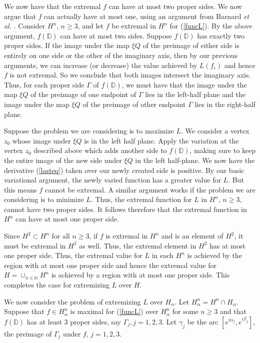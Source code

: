 \documentclass[final]{siamltex}
\newcommand{\dsp}{\displaystyle}
\newcommand{\N}{\mathbb{N}}
\newcommand{\D}{\mathbb{D}}
\newcommand{\eps}{\epsilon}
\begin{document}
We now have that the extremal $f$ can have at most two proper sides.  We now argue that $f$ can actually have at most one, using an argument from Barnard \emph{et al.} \cite{bw03}.  Consider $H^n,\, n \ge 3$, and let $f$ be extremal in $H^n$ for (\ref{funcL}).  By the above argument, $f(\D)$ can have at most two sides.  Suppose $f(\D)$ has exactly two proper sides. If the image under the map $\xi Q$ of the preimage of either side is entirely on one side or the other of the imaginary axis, then by our previous arguments, we can increase (or decrease) the value achieved by $L(f_{\eps})$ and hence $f$ is not extremal.  So we conclude that both images intersect the imaginary axis.  Thus, for each proper side $\Gamma$ of $f(\D)$, we must have that the image under the map $\xi Q$ of the preimage of one endpoint of $\Gamma$ lies in the left-half plane and the image under the map $\xi Q$ of the preimage of other endpoint $\Gamma$ lies in the right-half plane. 

Suppose the problem we are considering is to maximize $L$.  We consider a vertex $z_0$ whose image under $\xi Q$ is in the left half plane. Apply the variation at the vertex $z_0$ described above which adds another side to $f(\D)$, 
making sure to keep the entire image of the new side under $\xi Q$ in the left 
half-plane.  We now have the derivative (\ref{lasteq}) taken over our 
newly created side is positive.  By our basic variational argument, the newly varied 
function has a greater value for $L$.  But this means $f$ cannot 
be extremal.  A similar argument works if the problem we are considering is to minimize $L$. Thus, the extremal function for $L$ in $H^n,\, n\geq 3,$ cannot have two proper sides.  It follows therefore that the extremal function in $H^n$ can have at most one proper side.  

Since $H^2 \subset H^n$ for all $n \geq 3$, if $f$ is extremal in $H^n$ and is an element of $H^2$, it must be extremal in $H^2$ as well.  Thus, the extremal element in $H^2$ has at most one proper side.  Thus, the extremal value for $L$ in each $H^n$ is achieved by the region with at most one proper side and hence the extremal value for $\dsp{H = \overline{ \cup_{n\in \N} H^n}}$ is achieved by a region with at most one proper side.  This completes the case for extremizing $L$ over $H$.

We now consider the problem of extremizing $L$ over $H_{\alpha}$.  Let $H^n_{\alpha} = H^n \cap H_{\alpha}$.  Suppose that $f \in H^n_{\alpha}$ is maximal for (\ref{funcL}) over $H^n_{\alpha}$ for some $n \ge 3$ and that $f(\D)$ has at least $3$ proper sides, say $\Gamma_j, j=1,2,3$.  Let $\gamma_j$ be the arc $\left[ e^{i\alpha_j}, e^{i\beta_j} \right]$, the preimage of $\Gamma_j$ under $f$, $j=1,2,3$.  
\end{document}
